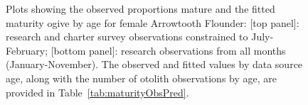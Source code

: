 \begin{figure}[htp]
\captionsetup[subfigure]{labelformat=empty}
\begin{center}
\newline
{}
\end{center}
\vspace{-8mm}
\caption{Plots showing the observed proportions mature and the fitted maturity ogive by age for female Arrowtooth Flounder: [top panel]: research and charter survey observations constrained to July-February; [bottom panel]: research observations from all months (January-November). The observed and fitted values by data source age, along with the number of otolith observations by age, are provided in Table~\ref{tab:maturityObsPred}.}
\label{fig:maturityfit}
\end{figure}

